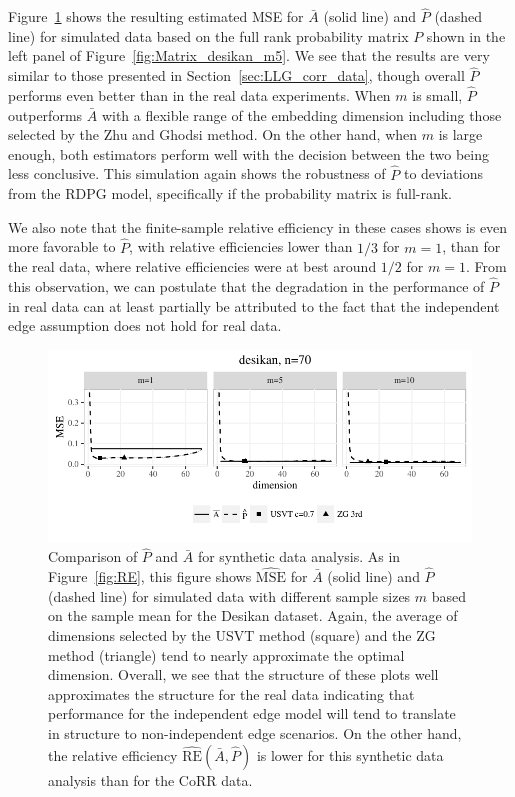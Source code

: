 Figure~\ref{fig:sim_desikan} shows the resulting estimated MSE for $\bar{A}$ (solid line) and $\hat{P}$ (dashed line) for simulated data based on the full rank probability matrix $P$ shown in the left panel of Figure~\ref{fig:Matrix_desikan_m5}.
We see that the results are very similar to those presented in Section~\ref{sec:LLG_corr_data}, though overall $\hat{P}$ performs even better than in the real data experiments. 
When $m$ is small, $\hat{P}$ outperforms $\bar{A}$ with a flexible range of the embedding dimension including those selected by the Zhu and Ghodsi method.
On the other hand, when $m$ is large enough, both estimators perform well with the decision between the two being less conclusive.
This simulation again shows the robustness of $\hat{P}$ to deviations from the RDPG model, specifically if the probability matrix is full-rank.

We also note that the finite-sample relative efficiency in these cases shows is even more favorable to $\hat{P}$, with relative efficiencies lower than $1/3$ for $m=1$, than for the real data, where relative efficiencies were at best around $1/2$ for $m=1$.
From this observation, we can postulate that the degradation in the performance of $\hat{P}$ in real data can at least partially be attributed to the fact that the independent edge assumption does not hold for real data.


\begin{figure}[!htbp]
\centering
\includegraphics[width=1\textwidth]{./Figures/sim_desikan.pdf}
\caption[Comparison of two estimators for synthetic data analysis]{Comparison of $\hat{P}$ and $\bar{A}$ for synthetic data analysis.
As in Figure~\ref{fig:RE}, this figure shows $\hat{\mathrm{MSE}}$ for $\bar{A}$ (solid line) and $\hat{P}$ (dashed line) for simulated data with different sample sizes $m$ based on the sample mean for the Desikan dataset. Again, the average of dimensions selected by the USVT method (square) and the ZG method (triangle) tend to nearly approximate the optimal dimension. 
Overall, we see that the structure of these plots well approximates the structure for the real data indicating that performance for the independent edge model will tend to translate in structure to non-independent edge scenarios. 
On the other hand, the relative efficiency $\hat{\mathrm{RE}}(\bar{A},\hat{P})$ is lower for this synthetic data analysis than for the CoRR data.}
\label{fig:sim_desikan}
\end{figure}




